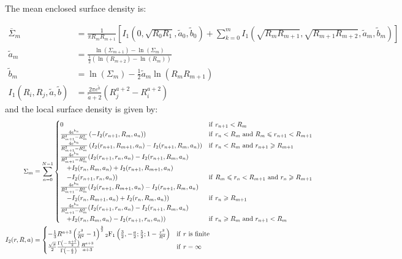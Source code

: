 \documentclass[usenatbib]{mnras}
\begin{document}
The mean enclosed surface density is:

\begin{align}
\overline{\Sigma}_m &= \frac{1}{\pi R_mR_{m+1}}\left[I_1(0, \sqrt{R_0R_1}, \tilde{a}_0, \tilde{b}_0) + 
\sum_{k=0}^m I_1(\sqrt{R_mR_{m+1}},\sqrt{R_{m+1}R_{m+2}}, \tilde{a}_m, \tilde{b}_m)\right]\\
  \tilde{a}_m &= \frac{\ln(\Sigma_{m+1})-\ln(\Sigma_m)}{\frac{1}{2}\left(\ln(R_{m+2})-\ln(R_m)\right)}\\
  \tilde{b}_m &= \ln(\Sigma_m) - \frac{1}{2}\tilde{a}_m\ln(R_mR_{m+1})\\
  I_1(R_i,R_j,\tilde{a},\tilde{b}) &= \frac{2\pi e^{\tilde{b}}}{\tilde{a}+2}\left(R_j^{a+2} - R_i^{a+2}\right)
\end{align}
\noindent and the local surface density is given by:
\begin{align}
  \Sigma_m &= \sum_{n=0}^{N-1}
  \begin{cases}
    0 & {\rm if}\ r_{n+1} < R_m\\
    \frac{4e^{b_n}}{R_{m+1}^2-R_m^2} \left(-I_2(r_{n+1},R_m,a_n)\right) & {\rm if}\ r_n < R_m\ {\rm and}\ R_m \leq r_{n+1} < R_{m+1}\\
    \frac{4e^{b_n}}{R_{m+1}^2-R_m^2} \left(I_2(r_{n+1},R_{m+1},a_n)-I_2(r_{n+1},R_m,a_n)\right) & {\rm if}\ r_n < R_m\ {\rm and}\ r_{n+1} \geq R_{m+1}\\
    \frac{4e^{b_n}}{R_{m+1}^2-R_m^2} (I_2(r_{n+1},r_n,a_n)-I_2(r_{n+1},R_m,a_n)\\ \quad +I_2(r_n,R_m,a_n)+I_2(r_{n+1},R_{m+1},a_n)\\ \quad -I_2(r_{n+1},r_n,a_n)) & {\rm if}\ R_m \leq r_n < R_{m+1}\ {\rm and}\ r_n \geq R_{m+1}\\
    \frac{4e^{b_n}}{R_{m+1}^2-R_m^2} (I_2(r_{n+1},R_{m+1},a_n)-I_2(r_{n+1},R_m,a_n)\\ \quad -I_2(r_n,R_{m+1},a_n)+I_2(r_n,R_m,a_n)) & {\rm if}\ r_n \geq R_{m+1}\\
    \frac{4e^{b_n}}{R_{m+1}^2-R_m^2} (I_2(r_{n+1},r_n,a_n)-I_2(r_{n+1},R_m,a_n)\\ \quad +I_2(r_n,R_m,a_n)-I_2(r_{n+1},r_n,a_n)) & {\rm if}\ r_n \geq R_m\ {\rm and}\ r_{n+1} < R_m\\
  \end{cases}\\
  I_2(r,R,a) &=
  \begin{cases}
    -\frac{1}{3}R^{a+3}\left(\frac{r^2}{R^2}-1\right)^{\frac{3}{2}}{}_2{\rm F}_1\left(\frac{3}{2},-\frac{a}{2};\frac{5}{2};1-\frac{r^2}{R^2}\right) & {\rm if}\ r\ {\rm is}\ {\rm finite}\\
    \frac{\sqrt{\pi}}{2}\frac{\Gamma\left(-\frac{a+1}{2}\right)}{\Gamma\left(-\frac{a}{2}\right)}\frac{R^{a+3}}{a+3} & {\rm if}\ r=\infty
  \end{cases}
\end{align}
\end{document}
